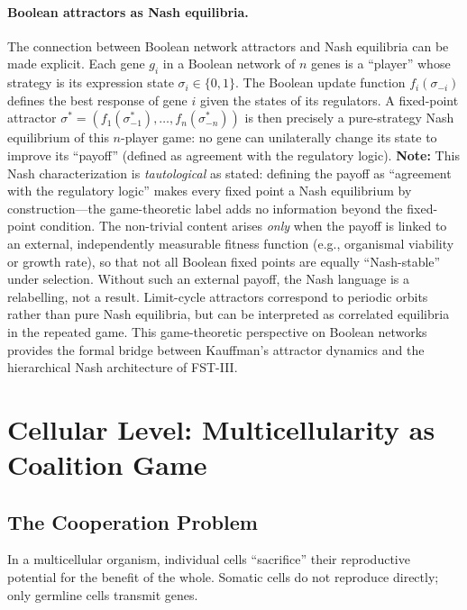\documentclass[12pt,a4paper]{article}
\theoremstyle{remark}
\begin{document}
\paragraph{Boolean attractors as Nash equilibria.}
The connection between Boolean network attractors and Nash equilibria can be made explicit. Each gene $g_i$ in a Boolean network of $n$ genes is a ``player'' whose strategy is its expression state $\sigma_i \in \{0, 1\}$. The Boolean update function $f_i(\sigma_{-i})$ defines the best response of gene $i$ given the states of its regulators. A fixed-point attractor $\sigma^* = (f_1(\sigma^*_{-1}), \dots, f_n(\sigma^*_{-n}))$ is then precisely a pure-strategy Nash equilibrium of this $n$-player game: no gene can unilaterally change its state to improve its ``payoff'' (defined as agreement with the regulatory logic). \textbf{Note:} This Nash characterization is \emph{tautological} as stated: defining the payoff as ``agreement with the regulatory logic'' makes every fixed point a Nash equilibrium by construction---the game-theoretic label adds no information beyond the fixed-point condition. The non-trivial content arises \emph{only} when the payoff is linked to an external, independently measurable fitness function (e.g., organismal viability or growth rate), so that not all Boolean fixed points are equally ``Nash-stable'' under selection. Without such an external payoff, the Nash language is a relabelling, not a result. Limit-cycle attractors correspond to periodic orbits rather than pure Nash equilibria, but can be interpreted as correlated equilibria in the repeated game. This game-theoretic perspective on Boolean networks provides the formal bridge between Kauffman's attractor dynamics and the hierarchical Nash architecture of FST-III.

\section{Cellular Level: Multicellularity as Coalition Game}
\label{sec:multicellularity}

\subsection{The Cooperation Problem}

In a multicellular organism, individual cells ``sacrifice'' their reproductive potential for the benefit of the whole. Somatic cells do not reproduce directly; only germline cells transmit genes.
\end{document}

